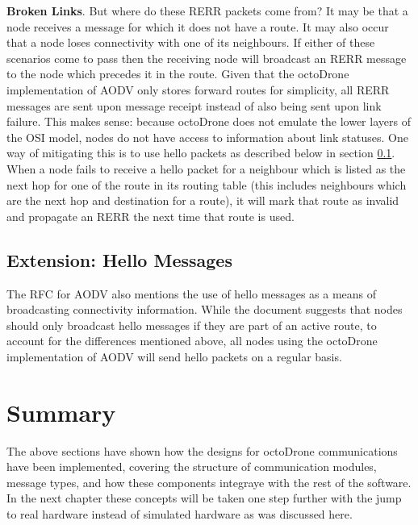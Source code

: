 \noindent\textbf{Broken Links}. 
But where do these RERR packets come from? It may be that a node receives a message for which it does not have a route. It may also occur that a node loses connectivity with one of its neighbours. If either of these scenarios come to pass then the receiving node will broadcast an RERR message to the node which precedes it in the route. Given that the octoDrone implementation of AODV only stores forward routes for simplicity, all RERR messages are sent upon message receipt instead of also being sent upon link failure. This makes sense: because octoDrone does not emulate the lower layers of the OSI model, nodes do not have access to information about link statuses. One way of mitigating this is to use hello packets as described below in section \ref{hello}. When a node fails to receive a hello packet for a neighbour which is listed as the next hop for one of the route in its routing table (this includes neighbours which are the next hop and destination for a route), it will mark that route as invalid and propagate an RERR the next time that route is used.

\subsection{Extension: Hello Messages}
\label{hello}
The RFC for AODV also mentions the use of hello messages as a means of broadcasting connectivity information. While the document suggests that nodes should only broadcast hello messages if they are part of an active route, to account for the differences mentioned above, all nodes using the octoDrone implementation of AODV will send hello packets on a regular basis.

\section{Summary}
The above sections have shown how the designs for octoDrone communications have been implemented, covering the structure of communication modules, message types, and how these components integraye with the rest of the software. In the next chapter these concepts will be taken one step further with the jump to real hardware instead of simulated hardware as was discussed here.


